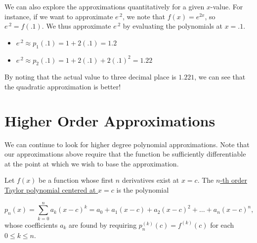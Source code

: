 \documentclass{ximera}
\begin{document}
\begin{image}
\end{image}

We can also explore the approximations quantitatively for a given $x$-value.  For instance, if we want to approximate $e^{.2}$, we note that $f(x)=e^{2x}$, so $e^{.2}=f(.1)$.  We thus approximate $e^{.2}$ by evaluating the polynomials at $x=.1$.

\begin{itemize}
\item $e^{.2} \approx p_1(.1) = 1+2(.1) = 1.2$
\item $e^{.2} \approx p_2(.1) = 1+2(.1)+2(.1)^2 = 1.22$
\end{itemize}

By noting that the actual value to three decimal place is $1.221$, we can see that the quadratic approximation is better! 

\section{Higher Order Approximations}

We can continue to look for higher degree polynomial approximations.  Note that our approximations above require that the function be sufficiently differentiable at the point at which we wish to base the approximation.

\begin{definition}
Let $f(x)$ be a function whose first $n$ derivatives exist at $x=c$.  The \underline{$n$-th order Taylor polynomial centered at $x=c$} is the polynomial

\[
p_n(x) = \sum_{k=0}^n a_k(x-c)^k = a_0+a_1(x-c)+a_2(x-c)^2+\ldots+ a_n(x-c)^n,
\]
whose coefficients $a_k$ are found by requiring $p_n^{(k)}(c) = f^{(k)}(c)$ for each $0 \leq k \leq n$.
\end{definition}
\end{document}
